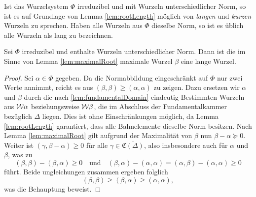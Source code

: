 \begin{bem}
  Ist das Wurzelsystem $\Phi$ irreduzibel und mit Wurzeln unterschiedlicher Norm, so ist es auf Grundlage von Lemma \ref{lem:rootLength} möglich von \emph{langen} und \emph{kurzen} Wurzeln zu sprechen.
  Haben alle Wurzeln aus $\Phi$ dieselbe Norm, so ist es üblich alle Wurzeln als lang zu bezeichnen.
\end{bem}

\begin{lem}
  Sei $\Phi$ irreduzibel und enthalte Wurzeln unterschiedlicher Norm.
  Dann ist die im Sinne von Lemma \ref{lem:maximalRoot} maximale Wurzel $\beta$ eine lange Wurzel.
\end{lem}

\begin{proof}
  Sei $\alpha \in \Phi$ gegeben.
  Da die Normabbildung eingeschränkt auf $\Phi$ nur zwei Werte annimmt, reicht es aus $(\beta, \beta) \geq (\alpha, \alpha)$ zu zeigen.
  Dazu ersetzen wir $\alpha$ und $\beta$ durch die nach \ref{lem:fundamentalDomain} eindeutig Bestimmten Wurzeln aus $\mathcal{W}\alpha$ beziehungsweise $\mathcal{W}\beta$, die im Abschluss der Fundamentalkammer bezüglich $\Delta$ liegen. 
  Dies ist ohne Einschränkungen möglich, da Lemma \ref{lem:rootLength} garantiert, dass alle Bahnelemente dieselbe Norm besitzen.
  Nach Lemma \ref{lem:maximalRoot} gilt aufgrund der Maximalität von $\beta$ nun $\beta - \alpha \succeq 0$.
  Weiter ist $(\gamma, \beta - \alpha) \geq 0$ für alle $\gamma \in \overline{\mathfrak{C}(\Delta)}$, also insbesondere auch für $\alpha$ und $\beta$, was zu 
  \begin{displaymath}
    (\beta, \beta) - (\beta, \alpha) \geq 0 \quad\text{und}\quad 
    (\beta, \alpha) - (\alpha, \alpha) 
    = (\alpha, \beta) - (\alpha, \alpha) \geq 0
  \end{displaymath}
  führt.
  Beide ungleichungen zusammen ergeben folglich
  \begin{displaymath}
    (\beta, \beta) \geq (\beta, \alpha) \geq (\alpha, \alpha),
  \end{displaymath}
  was die Behauptung beweist.
\end{proof}
